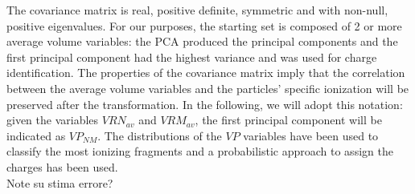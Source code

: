 \documentclass[utf8]{frontiersFPHY} %
\begin{document}
The covariance matrix is real, positive definite, symmetric and with non-null, positive eigenvalues. For our purposes, the starting set is composed of 2 or more average volume variables: the PCA produced the principal components and the first principal component had the highest variance and was used for charge identification. The properties of the covariance matrix imply that the correlation between the average volume variables and the particles' specific ionization will be preserved after the transformation. In the following, we will adopt this notation: given the variables $VRN_{av}$ and $VRM_{av}$, the first principal component will be indicated as $VP_{NM}$. The distributions of the $VP$ variables have been used to classify the most ionizing fragments and a probabilistic approach to assign the charges has been used. 
\\
Note su stima errore?




%

\newline

%
\newline
\end{document}
